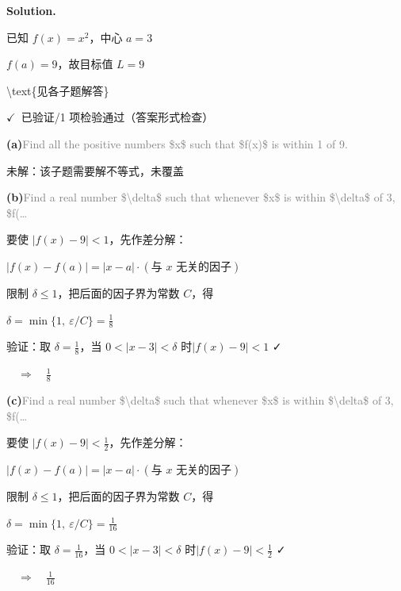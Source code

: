 \documentclass[12pt, a4paper]{article}
\newcommand{\solution}{%
  \par\noindent
  {\color{solutiongreen}\bfseries Solution.}\par
}
\newcommand{\verifyok}{\textcolor{solutiongreen}{\ensuremath{\checkmark}\ 已验证}}
\begin{document}
\solution

\begin{stepbox}
已知 $f(x) = x^{2}$，中心 $a = 3$
\end{stepbox}

\begin{stepbox}
$f(a) = 9$，故目标值 $L = 9$
\end{stepbox}

\begin{center}
\textbackslash{}text\{见各子题解答\}
\end{center}

\begin{verifybox}\small \verifyok{}/1 项检验通过（答案形式检查） \end{verifybox}

\vspace{0.3em}
\textbf{(a)}\quad \textcolor{gray}{\small Find all the positive numbers \$x\$ such that \$f(x)\$ is within 1 of 9.}

\textcolor{warnamber}{未解：该子题需要解不等式，未覆盖}

\textbf{(b)}\quad \textcolor{gray}{\small Find a real number \$\textbackslash{}delta\$ such that whenever \$x\$ is within \$\textbackslash{}delta\$ of 3, \$f(…}

要使 $|f(x) - 9| < 1$，先作差分解：

$|f(x)-f(a)| = |x-a|\cdot(\text{与 }x\text{ 无关的因子})$

限制 $\delta\le 1$，把后面的因子界为常数 $C$，得

$\delta = \min\{1,\ \varepsilon/C\} = \frac{1}{8}$

验证：取 $\delta = \frac{1}{8}$，当 $0<|x - 3| < \delta$ 时$|f(x) - 9| < 1$ ✓

$\quad\Rightarrow\quad \frac{1}{8}$

\textbf{(c)}\quad \textcolor{gray}{\small Find a real number \$\textbackslash{}delta\$ such that whenever \$x\$ is within \$\textbackslash{}delta\$ of 3, \$f(…}

要使 $|f(x) - 9| < \frac{1}{2}$，先作差分解：

$|f(x)-f(a)| = |x-a|\cdot(\text{与 }x\text{ 无关的因子})$

限制 $\delta\le 1$，把后面的因子界为常数 $C$，得

$\delta = \min\{1,\ \varepsilon/C\} = \frac{1}{16}$

验证：取 $\delta = \frac{1}{16}$，当 $0<|x - 3| < \delta$ 时$|f(x) - 9| < \frac{1}{2}$ ✓

$\quad\Rightarrow\quad \frac{1}{16}$
\end{document}
